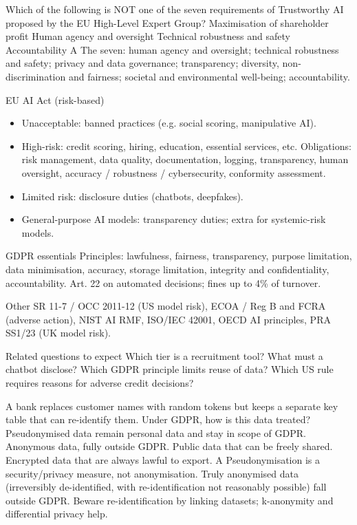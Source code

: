 {Which of the following is NOT one of the seven requirements of Trustworthy AI proposed by the EU High-Level Expert Group?}
{Maximisation of shareholder profit}
{Human agency and oversight}
{Technical robustness and safety}
{Accountability}
{A}
{The seven: human agency and oversight; technical robustness and safety; privacy and data governance; transparency; diversity, non-discrimination and fairness; societal and environmental well-being; accountability.}

{\begin{block}{EU AI Act (risk-based)}
		\begin{itemize}
			\item Unacceptable: banned practices (e.g. social scoring, manipulative AI).
			\item High-risk: credit scoring, hiring, education, essential services, etc. Obligations: risk management, data quality, documentation, logging, transparency, human oversight, accuracy / robustness / cybersecurity, conformity assessment.
			\item Limited risk: disclosure duties (chatbots, deepfakes).
			\item General-purpose AI models: transparency duties; extra for systemic-risk models.
\end{itemize}\end{block}}
{\begin{block}{GDPR essentials}
		Principles: lawfulness, fairness, transparency, purpose limitation, data minimisation, accuracy, storage limitation, integrity and confidentiality, accountability. Art. 22 on automated decisions; fines up to 4\% of turnover.
	\end{block}
	\begin{block}{Other}
		SR 11-7 / OCC 2011-12 (US model risk), ECOA / Reg B and FCRA (adverse action), NIST AI RMF, ISO/IEC 42001, OECD AI principles, PRA SS1/23 (UK model risk).
	\end{block}
	\begin{alertblock}{Related questions to expect}
		Which tier is a recruitment tool? What must a chatbot disclose? Which GDPR principle limits reuse of data? Which US rule requires reasons for adverse credit decisions?
\end{alertblock}}

{A bank replaces customer names with random tokens but keeps a separate key table that can re-identify them. Under GDPR, how is this data treated?}
{Pseudonymised data remain personal data and stay in scope of GDPR.}
{Anonymous data, fully outside GDPR.}
{Public data that can be freely shared.}
{Encrypted data that are always lawful to export.}
{A}
{Pseudonymisation is a security/privacy measure, not anonymisation. Truly anonymised data (irreversibly de-identified, with re-identification not reasonably possible) fall outside GDPR. Beware re-identification by linking datasets; k-anonymity and differential privacy help.}

